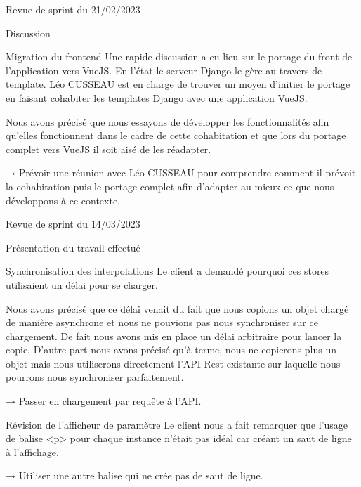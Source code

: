 \documentclass[]{article}
\begin{document}
{\begin{section}{Revue de sprint du 21/02/2023}
 \begin{subsection}{Discussion}
     \begin{subsubsection}{Migration du frontend}
         Une rapide discussion a eu lieu sur le portage du front de l’application vers VueJS. En l’état le serveur Django le gère au travers de template. Léo CUSSEAU est en charge de trouver un moyen d’initier le portage en faisant cohabiter les templates Django avec une application VueJS.

         Nous avons précisé que nous essayons de développer les fonctionnalités afin qu’elles fonctionnent dans le cadre de cette cohabitation et que lors du portage complet vers VueJS il soit aisé de les réadapter.

         → Prévoir une réunion avec Léo CUSSEAU pour comprendre comment il prévoit la cohabitation puis le portage complet afin d’adapter au mieux ce que nous développons à ce contexte.
     \end{subsubsection}
 \end{subsection}
\end{section}

\begin{section}{Revue de sprint du 14/03/2023}
 \begin{subsection}{Présentation du travail effectué}
     \begin{subsubsection}{Synchronisation des interpolations}
         Le client a demandé pourquoi ces stores utilisaient un délai pour se charger.

         Nous avons précisé que ce délai venait du fait que nous copions un objet chargé de manière asynchrone et nous ne pouvions pas nous synchroniser sur ce chargement. De fait nous avons mis en place un délai arbitraire pour lancer la copie. D’autre part nous avons précisé qu'à terme, nous ne copierons plus un objet mais nous utiliserons directement l’API Rest existante sur laquelle nous pourrons nous synchroniser parfaitement.

         → Passer en chargement par requête à l’API.
     \end{subsubsection}

     \begin{subsubsection}{Révision de l’afficheur de paramètre}
         Le client nous a fait remarquer que l’usage de balise <p> pour chaque instance n’était pas idéal car créant un saut de ligne à l’affichage.

         → Utiliser une autre balise qui ne crée pas de saut de ligne.
     \end{subsubsection}
 \end{subsection}


\end{section}}
\end{document}
